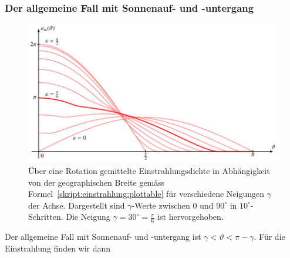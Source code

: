 \subsubsection{Der allgemeine Fall mit Sonnenauf- und -untergang}
\begin{figure}
\centering
\includegraphics[width=\hsize]{chapters/5/ein.pdf}
\caption{Über eine Rotation gemittelte Einstrahlungsdichte
in Abhängigkeit von der geographischen Breite
gemäss Formel~\eqref{skript:einstrahlung:plottable} für verschiedene
Neigungen $\gamma$ der Achse. 
Dargestellt sind $\gamma$-Werte zwischen 0 und $90^\circ$ 
in $10^\circ$-Schritten. 
Die Neigung $\gamma=30^\circ=\frac{\pi}{6}$ ist hervorgehoben.
\label{skript:einstrahlung:ein}}
\end{figure}%
Der allgemeine Fall mit Sonnenauf- und -untergang
ist $\gamma < \vartheta < \pi-\gamma$.
Für die Einstrahlung finden wir dann
